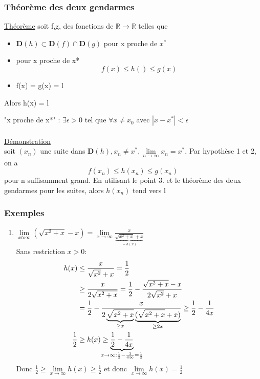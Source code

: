 \documentclass[12pt,a4paper]{article}
\newcommand{\limite}{\lim\limits_}
\newcommand{\ninf}{\ensuremath{n \to \infty}}
\newcommand{\R}{\ensuremath{\mathbb{R}} }
\newcommand{\rtor}{\ensuremath{\R \to \R} }
\begin{document}
{\subsubsection{Théorème des deux gendarmes}
\begin{boite}
\underline{Théorème} soit f,g, des fonctions de $\rtor$ telles que 
\begin{itemize}
\item $\mathbf{D}(h) \subset \mathbf{D}(f) \cap \mathbf{D}(g)$ pour x proche de $x^*$
\item pour x proche de x* 
\begin{equation}
f(x) \leq h() \leq g(x)
\end{equation}
\item f(x) = g(x) = l 
\end{itemize}
Alors h(x) = l
\end{boite}
"x proche de x*" : $\exists \epsilon > 0$ tel que $\forall x \neq x_0$ avec $|x -x^*| < \epsilon$\\
\\
\underline{Démonstration}\\
soit $(x_n)$ une suite dans $\mathbf{D}(h),x_n \neq x^*, \limite{\ninf} x_n = x^*$. Par hypothèse 1 et 2, on a 
\begin{equation}
f(x_n) \leq h(x_n) \leq g(x_n)
\end{equation}
pour n suffisamment grand. En utilisant le point 3. et le théorème des deux gendarmes pour les suites, alors $h(x_n)$ tend vers l
\subsubsection{Exemples}
\begin{enumerate}
\item $\limite{x to \infty} (\sqrt{x^2+x}-x) = \limite{x \to \infty} \frac{x}{\underbrace{\sqrt{x^2+x}+x}_{= h(x)}}$ \\
Sans restriction $x > 0 :$\begin{align*}
h(x) &\leq \frac{x}{\sqrt{x^2}+x} = \frac{1}{2}\\
& \geq \frac{x}{2\sqrt{x^2+x}}=\frac{1}{2} - \frac{\sqrt{x^2+x}-x}{2\sqrt{x^2}+x}\\
& = \frac{1}{2}- \frac{x}{2\underbrace{\sqrt{x^2+x}}_{\geq x}\underbrace{(\sqrt{x^2+x} +x)}_{\geq 2x}} \geq \frac{1}{2}-\frac{1}{4x}\\
\frac{1}{2}&\geq h(x) \geq \underbrace{\frac{1}{2}-\frac{1}{4x}}_{\mathclap{x\to \infty : \frac{1}{2}-\frac{1}{4\infty}= \frac{1}{2}}}
\end{align*} 
Donc $\frac{1}{2} \geq \limite{x \to \infty} h(x) \geq \frac{1}{2}$ et donc $\limite{x\to\infty} h(x) = \frac{1}{2}$


\end{enumerate}}
\end{document}
